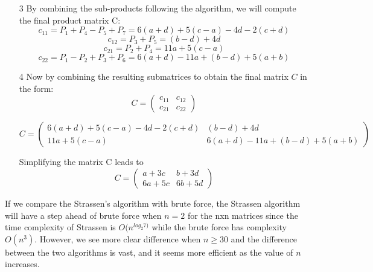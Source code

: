 \documentclass[a4paper]{exam}
\begin{document}
\begin{questions}
\begin{solution}
\begin{itemize}
  \item[3] By combining the sub-products following the algorithm, we will compute the final product matrix C:
  \[c_{11} = P_1 + P_4 - P_5 + P_7 = 6(a+d) + 5(c-a) - 4d - 2(c+d)\]  
  \[c_{12} = P_3 + P_5 = (b - d) + 4d\] 
  \[c_{21} = P_2 + P_4 = 11a + 5(c-a)\] 
  \[c_{22} = P_1 - P_2 + P_3 + P_6 = 6(a+d) - 11a + (b - d) + 5(a+b)\]

  \item[4] Now by combining the resulting submatrices to obtain the final matrix $C$ in the form:
  \[C = \begin{pmatrix}
    c_{11} & c_{12}\\ 
    c_{21} & c_{22}
  \end{pmatrix}\] 

  \[ C = \begin{pmatrix}
    6(a+d) + 5(c-a) - 4d - 2(c+d) & (b - d) + 4d\\ 
    11a + 5(c-a) & 6(a+d) - 11a + (b - d) + 5(a+b)
  \end{pmatrix}\]

  Simplifying the matrix C leads to
  \[ C = \begin{pmatrix}
    a + 3c & b  + 3d\\ 
    6a + 5c & 6b + 5d   
  \end{pmatrix}\]
\end{itemize}

If we compare the Strassen's algorithm with brute force, the Strassen algorithm will have a step ahead of brute force when $n=2$ for the nxn matrices since the time complexity of Strassen is $O(n^{log_{2}7)}$ while the brute force has complexity $O(n^3)$. However, we see more clear difference when $n \geq 30$ and the difference between the two algorithms is vast, and it seems more efficient as the value of $n$ increases.

\end{solution}


\end{questions}



\end{document}

